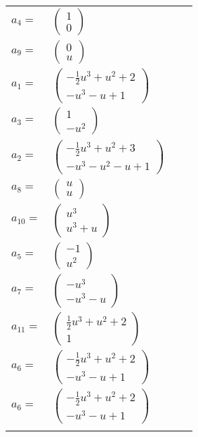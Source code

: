 \documentclass[1p]{elsarticle_modified}
\theoremstyle{definition}
\begin{document}
\begin{tabular}{m{7pt} m{180pt} m{7pt} m{180pt} }
\flushright $a_{4}=$&$\begin{pmatrix}1\\0\end{pmatrix}$ \\
\flushright $a_{9}=$&$\begin{pmatrix}0\\u\end{pmatrix}$ \\
\flushright $a_{1}=$&$\begin{pmatrix}-\frac{1}{2} u^3+u^2+2\\- u^3- u+1\end{pmatrix}$ \\
\flushright $a_{3}=$&$\begin{pmatrix}1\\- u^2\end{pmatrix}$ \\
\flushright $a_{2}=$&$\begin{pmatrix}-\frac{1}{2} u^3+u^2+3\\- u^3- u^2- u+1\end{pmatrix}$ \\
\flushright $a_{8}=$&$\begin{pmatrix}u\\u\end{pmatrix}$ \\
\flushright $a_{10}=$&$\begin{pmatrix}u^3\\u^3+u\end{pmatrix}$ \\
\flushright $a_{5}=$&$\begin{pmatrix}-1\\u^2\end{pmatrix}$ \\
\flushright $a_{7}=$&$\begin{pmatrix}- u^3\\- u^3- u\end{pmatrix}$ \\
\flushright $a_{11}=$&$\begin{pmatrix}\frac{1}{2} u^3+u^2+2\\1\end{pmatrix}$ \\
\flushright $a_{6}=$&$\begin{pmatrix}-\frac{1}{2} u^3+u^2+2\\- u^3- u+1\end{pmatrix}$\\ \flushright $a_{6}=$&$\begin{pmatrix}-\frac{1}{2} u^3+u^2+2\\- u^3- u+1\end{pmatrix}$\\&\end{tabular}
\end{document}
